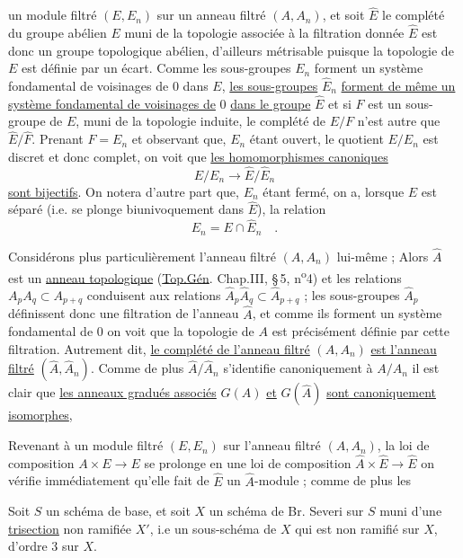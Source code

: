 un module filtré $(E,E_n)$ sur un anneau filtré $(A,A_n)$, et soit $\hat E$ le complété du groupe abélien $E$ muni de la topologie associée à la filtration donnée $\hat E$ est donc un groupe topologique abélien, d'ailleurs métrisable puisque la topologie de $E$ est définie par un écart. Comme les sous-groupes $E_n$ forment un système fondamental de voisinages de $0$ dans $E$, \uline{les sous-groupes} $\hat E_n$ \uline{forment de même un système fondamental de voisinages de} $0$ \uline{dans le groupe} $\hat E$ et si $F$ est un sous-groupe de $E$, muni de la topologie induite, le complété de $E/F$ n'est autre que $\hat E/\hat F$. Prenant $F=E_n$ et observant que, $E_n$ étant ouvert, le quotient $E/E_n$ est discret et donc complet, on voit que \uline{les homomorphismes canoniques}
\[
E/E_n\longrightarrow\hat E/\hat E_n
\]
\uline{sont bijectifs}. On notera d'autre part que, $E_n$ étant fermé, on a, lorsque $E$ est séparé (i.e. se plonge biunivoquement dans $\hat E$), la relation
\[
E_n=E\cap\hat E_n\quad.
\]

Considérons plus particulièrement l'anneau filtré $(A,A_n)$ lui-même ; Alors $\hat A$ est un \uline{anneau topologique} (\uline{Top.Gén}. Chap.III, \S\,5, n\textsuperscript{o}4) et les relations $A_p A_q\subset A_{p+q}$ conduisent aux relations $\hat A_p\hat A_q\subset\hat A_{p+q}$ ; les sous-groupes $\hat A_p$ définissent donc une filtration de l'anneau $\hat A$, et comme ils forment un système fondamental de $0$ on voit que la topologie de $A$ est précisément définie par cette filtration. Autrement dit, \uline{le complété de l'anneau filtré} $(A,A_n)$ \uline{est l'anneau filtré} $(\hat A,\hat A_n)$. Comme de plus $\hat A/\hat A_n$ s'identifie canoniquement à $A/A_n$ il est clair que \uline{les anneaux gradués associés} $G(A)$ \uline{et} $G(\hat A)$ \uline{sont canoniquement isomorphes},

Revenant à un module filtré $(E,E_n)$ sur l'anneau filtré $(A,A_n)$, la loi de composition $A\times E\longrightarrow E$ se prolonge en une loi de composition $\hat A\times\hat E\longrightarrow\hat E$ on vérifie immédiatement qu'elle fait de $\hat E$ un $\hat A$-module ; comme de plus les

Soit $S$ un schéma de base, et soit $X$ un schéma de Br. Severi sur $S$ muni d'une \uline{trisection} non ramifiée $X'$, i.e un sous-schéma  de $X$ qui est non ramifié sur $X$, d'ordre 3 sur $X$.

